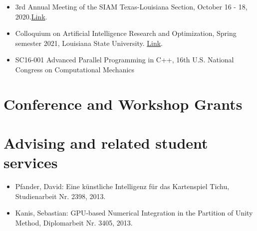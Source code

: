 \documentclass[11pt,a4paper,sans]{moderncv}
\begin{document}
\begin{itemize}[leftmargin=4cm]
\item 3rd Annual Meeting of the SIAM Texas-Louisiana Section, October 16 - 18, 2020.\href{https://www.math.tamu.edu/conferences/SIAMTXLA/}{Link}.
\end{itemize}

\begin{itemize}[leftmargin=4cm]
\item Colloquium on Artificial Intelligence Research and Optimization, Spring semester 2021, Louisiana State University. \href{https://stellar-group.org/research/distributed-machine-learning/}{Link}.
\end{itemize}

\begin{itemize}[leftmargin=4cm]
\item SC16-001 Advanced Parallel Programming in C++, 16th U.S. National Congress on Computational Mechanics
\end{itemize}

\section{Conference and Workshop Grants}

\section{Advising and related student services}
\begin{itemize}[leftmargin=4cm]
\item Pfander, David: Eine künstliche Intelligenz für das Kartenspiel Tichu, Studienarbeit Nr. 2398, 2013.
\item Kanis, Sebastian: GPU-based Numerical Integration in the Partition of Unity Method, Diplomarbeit Nr. 3405, 2013.
\end{itemize}
\end{document}
